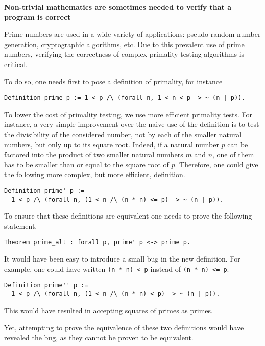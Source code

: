 \pagebreak
\begin{framed}
  \begin{center} {\bf \Large Non-trivial mathematics are sometimes
      needed to verify that a program is correct}
\end{center}

Prime numbers are used in a wide variety of applications:
pseudo-random number generation, cryptographic algorithms, etc.
Due to this prevalent use of prime numbers, verifying the correctness
of complex primality testing algorithms is critical.

To do so, one needs first to pose a definition of primality, for instance

\begin{verbatim}
Definition prime p := 1 < p /\ (forall n, 1 < n < p -> ~ (n | p)).
\end{verbatim}

To lower the cost of primality testing, we use more efficient
primality tests.  For instance, a very simple improvement over the
naive use of the definition is to test the divisibility of the
considered number, not by each of the smaller natural numbers, but
only up to its square root.  Indeed, if a natural number $p$ can be
factored into the product of two smaller natural numbers $m$ and $n$,
one of them has to be smaller than or equal to the square root of $p$.
Therefore, one could give the following more complex, but more
efficient, definition.

\begin{verbatim}
Definition prime' p :=
  1 < p /\ (forall n, (1 < n /\ (n * n) <= p) -> ~ (n | p)).
\end{verbatim}

To ensure that these definitions are equivalent one needs to prove
the following statement.

\begin{verbatim}
Theorem prime_alt : forall p, prime' p <-> prime p.
\end{verbatim}

It would have been easy to introduce a small bug
in the new definition.  For example, one could have written
\verb!(n * n) < p! instead of \verb!(n * n) <= p!.

\begin{verbatim}
Definition prime'' p :=
  1 < p /\ (forall n, (1 < n /\ (n * n) < p) -> ~ (n | p)).
\end{verbatim}
This would have resulted in accepting squares of primes as primes.

Yet, attempting to prove the equivalence of these two definitions would
have revealed the bug, as they cannot be proven to be equivalent.
\end{framed}
